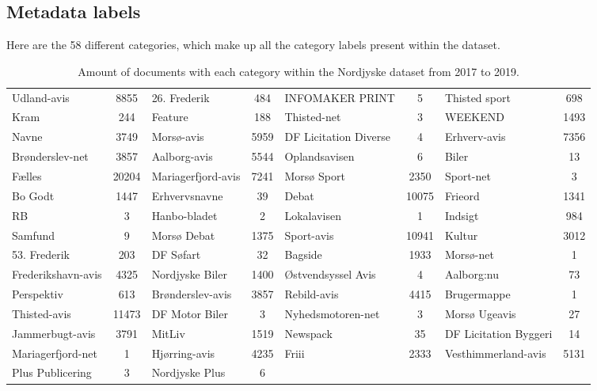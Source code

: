 \subsection{Metadata labels}\label{sec:appendix_meta_data}
Here are the 58 different categories, which make up all the category labels present within the dataset.

\begin{table*}[h]
	\centering
	\begin{tabular}{l|c|l|c|l|c|l|c}
		Udland-avis	& 8855 & 26. Frederik & 484 & INFOMAKER PRINT & 5 & Thisted sport & 698\\
		Kram & 244 & Feature & 188 & Thisted-net & 3 & WEEKEND & 1493\\
		Navne & 3749 & Morsø-avis & 5959 & DF Licitation Diverse & 4 & Erhverv-avis & 7356\\
		Brønderslev-net & 3857 & Aalborg-avis & 5544 & Oplandsavisen & 6 & Biler & 13\\
		Fælles & 20204 & Mariagerfjord-avis & 7241 & Morsø Sport & 2350 & Sport-net & 3\\
		Bo Godt & 1447 & Erhvervsnavne & 39 & Debat & 10075 & Frieord & 1341\\
		RB & 3 & Hanbo-bladet & 2 & Lokalavisen & 1 & Indsigt & 984\\
		Samfund & 9 & Morsø Debat & 1375 & Sport-avis & 10941 & Kultur & 3012 \\
		53. Frederik & 203 & DF Søfart & 32 & Bagside & 1933 & Morsø-net & 1 \\
		Frederikshavn-avis & 4325 & Nordjyske Biler & 1400 & Østvendsyssel Avis & 4 & Aalborg:nu & 73\\
		Perspektiv & 613 & Brønderslev-avis & 3857 & Rebild-avis & 4415 & Brugermappe & 1\\
		Thisted-avis & 11473 & DF Motor Biler & 3 & Nyhedsmotoren-net & 3 & Morsø Ugeavis & 27\\
		Jammerbugt-avis & 3791 & MitLiv & 1519 & Newspack & 35 & DF Licitation Byggeri & 14\\
		Mariagerfjord-net & 1 & Hjørring-avis & 4235 & Friii & 2333 & Vesthimmerland-avis & 5131\\
		Plus Publicering & 3 & Nordjyske Plus & 6 & & & & \\
	\end{tabular}
	\caption{Amount of documents with each category within the Nordjyske dataset from 2017 to 2019.}
	\label{tab:category_table}
\end{table*}
